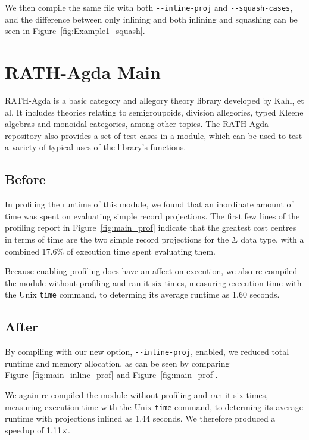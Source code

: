 We then compile the same file with both \texttt{-{}-inline-proj} and \texttt{-{}-squash-cases}, and the difference between only inlining and both inlining and squashing can be seen in Figure~\ref{fig:Example1_squash}.

\section{RATH-Agda Main}
\label{sec:app_one}

RATH-Agda is a basic category and allegory theory library developed by Kahl, et al.\cite{kahl2017} It includes theories relating to semigroupoids, division allegories, typed Kleene algebras and monoidal categories, among other topics.\cite{kahl2017} The RATH-Agda repository also provides a set of test cases in a  module, which can be used to test a variety of typical uses of the library's functions.

\subsection{Before}



In profiling the runtime of this  module, we found that an inordinate amount of time was spent on evaluating simple record projections. The first few lines of the profiling report in Figure~\ref{fig:main_prof} indicate that the greatest cost centres in terms of time are the two simple record projections for the $\Sigma$ data type, with a combined 17.6\% of execution time spent evaluating them.

Because enabling profiling does have an affect on execution, we also re-compiled the module without profiling and ran it six times, measuring execution time with the Unix \texttt{time} command, to determing its average runtime as 1.60 seconds.

\subsection{After}



By compiling  with our new option, \texttt{-{}-inline-proj}, enabled, we reduced total runtime and memory allocation, as can be seen by comparing Figure~\ref{fig:main_inline_prof} and Figure~\ref{fig:main_prof}.

We again re-compiled the module without profiling and ran it six times, measuring execution time with the Unix \texttt{time} command, to determing its average runtime with projections inlined as 1.44 seconds. We therefore produced a speedup of 1.11$\times$.

